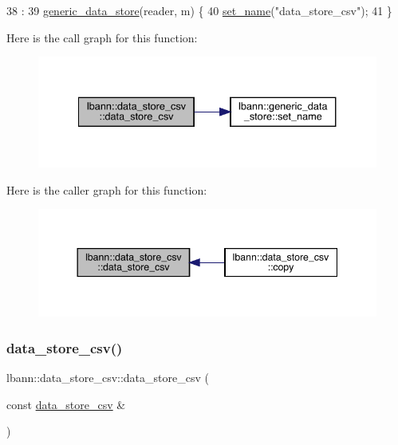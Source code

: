 \begin{DoxyCode}
38                                          :
39   \hyperlink{classlbann_1_1generic__data__store_acbcd88161c06f4bb9a70bbae857d4ee0}{generic\_data\_store}(reader, m) \{
40   \hyperlink{classlbann_1_1generic__data__store_a853741295a07b5687921fc56d0d7d5b2}{set\_name}(\textcolor{stringliteral}{"data\_store\_csv"});
41 \}
\end{DoxyCode}
Here is the call graph for this function\+:\nopagebreak
\begin{figure}[H]
\begin{center}
\leavevmode
\includegraphics[width=334pt]{classlbann_1_1data__store__csv_add3e9e9c37f1cdf0e3dba00cc6f49507_cgraph}
\end{center}
\end{figure}
Here is the caller graph for this function\+:\nopagebreak
\begin{figure}[H]
\begin{center}
\leavevmode
\includegraphics[width=344pt]{classlbann_1_1data__store__csv_add3e9e9c37f1cdf0e3dba00cc6f49507_icgraph}
\end{center}
\end{figure}
\mbox{\label{classlbann_1_1data__store__csv_af6bdd542f3e87528c3f2ee2b6f9fdff8}} 
\subsubsection{\texorpdfstring{data\+\_\+store\+\_\+csv()}{data\_store\_csv()}\hspace{0.1cm}{\footnotesize\ttfamily [2/2]}}
{\footnotesize\ttfamily lbann\+::data\+\_\+store\+\_\+csv\+::data\+\_\+store\+\_\+csv (\begin{DoxyParamCaption}\item[{const \hyperlink{classlbann_1_1data__store__csv}{data\+\_\+store\+\_\+csv} \&}]{ }\end{DoxyParamCaption})\hspace{0.3cm}{\ttfamily [default]}}



